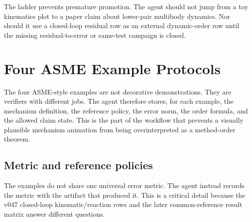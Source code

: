 \documentclass[10pt]{article}
\begin{document}
The ladder prevents premature promotion. The agent should not jump from a toy
kinematics plot to a paper claim about lower-pair multibody dynamics. Nor
should it use a closed-loop residual row as an external dynamic-order row until
the missing residual-to-error or same-test campaign is closed.

\section{Four ASME Example Protocols}
\label{sec:asme_protocols}

The four ASME-style examples are not decorative demonstrations. They are
verifiers with different jobs. The agent therefore stores, for each example,
the mechanism definition, the reference policy, the error norm, the order
formula, and the allowed claim state. This is the part of the workflow that
prevents a visually plausible mechanism animation from being overinterpreted
as a method-order theorem.

\subsection{Metric and reference policies}

The examples do not share one universal error metric. The agent instead
records the metric with the artifact that produced it. This is a critical
detail because the v047 closed-loop kinematic/reaction rows and the later
common-reference result matrix answer different questions.
\end{document}
